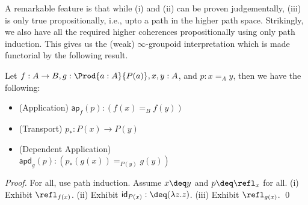 A remarkable feature is that while (i) and (ii) can be proven judgementally, (iii) is only true propositionally,
i.e., upto a path in the higher path space.
Strikingly, we also have all the required higher coherences propositionally using only path induction.
This gives us the (weak) $\infty$-groupoid interpretation which is made functorial by the following result.

\begin{proposition}
Let $f : A \to B, g : \Prod{a:A}{P(a)}, x, y : A$, and $p : x =_A y$, then we have the following: 
  \begin{itemize}
    \item [(i)] (Application) $\mathsf{ap}_f(p) : (f(x) =_B f(y))$
    \item [(ii)] (Transport) $p_* : P(x) \to P(y)$ 
    \item [(iii)] (Dependent Application) \\ $\mathsf{apd}_g(p) : (p_*(g(x)) =_{P(y)} g(y))$ 
  \end{itemize}
\end{proposition}
\textit{Proof.} For all, use path induction. Assume $x \deq y$ and $p \deq \refl_x$ for all.
(i) Exhibit $\refl_{f(x)}$.
(ii) Exhibit $\mathsf{id}_{P(x)} :\deq (\lambda z.z)$.
(iii) Exhibit $\refl_{g(x)}$.
\qed


